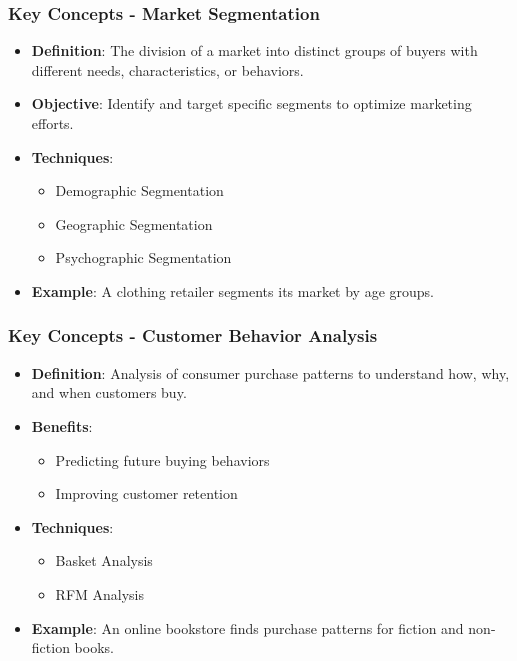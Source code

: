 \documentclass[aspectratio=169]{beamer}
\begin{document}
\begin{frame}[fragile]
    \frametitle{Key Concepts - Market Segmentation}
    \begin{itemize}
        \item \textbf{Definition}: The division of a market into distinct groups of buyers with different needs, characteristics, or behaviors.
        \item \textbf{Objective}: Identify and target specific segments to optimize marketing efforts.
        \item \textbf{Techniques}:
        \begin{itemize}
            \item Demographic Segmentation
            \item Geographic Segmentation
            \item Psychographic Segmentation
        \end{itemize}
        \item \textbf{Example}: A clothing retailer segments its market by age groups.
    \end{itemize}
\end{frame}

\begin{frame}[fragile]
    \frametitle{Key Concepts - Customer Behavior Analysis}
    \begin{itemize}
        \item \textbf{Definition}: Analysis of consumer purchase patterns to understand how, why, and when customers buy.
        \item \textbf{Benefits}:
        \begin{itemize}
            \item Predicting future buying behaviors
            \item Improving customer retention
        \end{itemize}
        \item \textbf{Techniques}:
        \begin{itemize}
            \item Basket Analysis
            \item RFM Analysis
        \end{itemize}
        \item \textbf{Example}: An online bookstore finds purchase patterns for fiction and non-fiction books.
    \end{itemize}
\end{frame}
\end{document}
